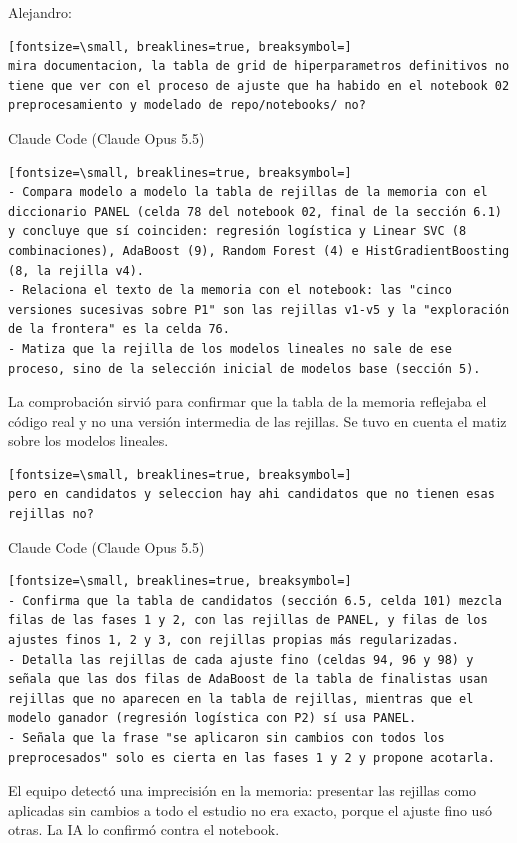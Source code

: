 \documentclass[12pt,a4paper,oneside]{book}
\begin{document}
\begin{iaprompt}
Alejandro:
\begin{iaprompt}
\begin{Verbatim}[fontsize=\small, breaklines=true, breaksymbol=]
mira documentacion, la tabla de grid de hiperparametros definitivos no tiene que ver con el proceso de ajuste que ha habido en el notebook 02 preprocesamiento y modelado de repo/notebooks/ no?
\end{Verbatim}
\end{iaprompt}
\begin{iaresp}{Claude Code (Claude Opus 5.5)}
\begin{Verbatim}[fontsize=\small, breaklines=true, breaksymbol=]
- Compara modelo a modelo la tabla de rejillas de la memoria con el diccionario PANEL (celda 78 del notebook 02, final de la sección 6.1) y concluye que sí coinciden: regresión logística y Linear SVC (8 combinaciones), AdaBoost (9), Random Forest (4) e HistGradientBoosting (8, la rejilla v4).
- Relaciona el texto de la memoria con el notebook: las "cinco versiones sucesivas sobre P1" son las rejillas v1-v5 y la "exploración de la frontera" es la celda 76.
- Matiza que la rejilla de los modelos lineales no sale de ese proceso, sino de la selección inicial de modelos base (sección 5).
\end{Verbatim}
\end{iaresp}
\begin{iaanalisis}
La comprobación sirvió para confirmar que la tabla de la memoria reflejaba el código real y no una versión intermedia de las rejillas. Se tuvo en cuenta el matiz sobre los modelos lineales.
\end{iaanalisis}


\begin{iaprompt}
\begin{Verbatim}[fontsize=\small, breaklines=true, breaksymbol=]
pero en candidatos y seleccion hay ahi candidatos que no tienen esas rejillas no?
\end{Verbatim}
\end{iaprompt}
\begin{iaresp}{Claude Code (Claude Opus 5.5)}
\begin{Verbatim}[fontsize=\small, breaklines=true, breaksymbol=]
- Confirma que la tabla de candidatos (sección 6.5, celda 101) mezcla filas de las fases 1 y 2, con las rejillas de PANEL, y filas de los ajustes finos 1, 2 y 3, con rejillas propias más regularizadas.
- Detalla las rejillas de cada ajuste fino (celdas 94, 96 y 98) y señala que las dos filas de AdaBoost de la tabla de finalistas usan rejillas que no aparecen en la tabla de rejillas, mientras que el modelo ganador (regresión logística con P2) sí usa PANEL.
- Señala que la frase "se aplicaron sin cambios con todos los preprocesados" solo es cierta en las fases 1 y 2 y propone acotarla.
\end{Verbatim}
\end{iaresp}
\begin{iaanalisis}
El equipo detectó una imprecisión en la memoria: presentar las rejillas como aplicadas sin cambios a todo el estudio no era exacto, porque el ajuste fino usó otras. La IA lo confirmó contra el notebook.
\end{iaanalisis}



\end{iaprompt}
\end{document}
